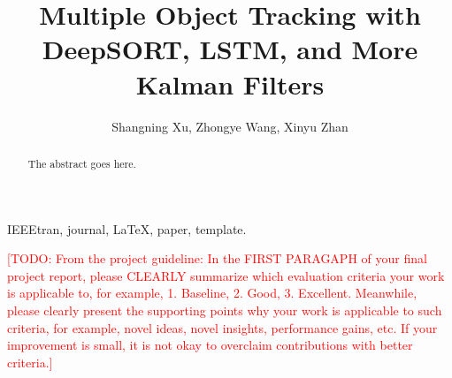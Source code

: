 \documentclass[conference]{IEEEtran}
\newcommand{\todo}[1]{\textcolor{red}{[TODO: #1]}}
\begin{document}
%
\title{Multiple Object Tracking with DeepSORT, LSTM, and More Kalman Filters}
%
%
%

\author{
    Shangning Xu,
    Zhongye Wang,
    Xinyu Zhan
}

%


\maketitle

\begin{abstract}
The abstract goes here.
\end{abstract}

\begin{IEEEkeywords}
IEEEtran, journal, \LaTeX, paper, template.
\end{IEEEkeywords}


\IEEEpeerreviewmaketitle

\todo{From the project guideline: In the FIRST PARAGAPH of your final project report, please CLEARLY summarize which evaluation criteria your work is applicable to, for example, 1. Baseline, 2. Good, 3. Excellent. Meanwhile, please clearly present the supporting points why your work is applicable to such criteria, for example, novel  ideas, novel insights, performance gains, etc. If your improvement is small, it is not okay to overclaim contributions with better criteria.}
\end{document}
